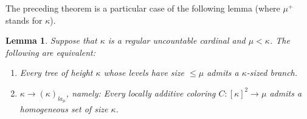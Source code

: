 \documentclass[11pt]{amsart}
\theoremstyle{plain}
\newtheorem{lemma}[theorem]{Lemma}
\theoremstyle{definition} %
\theoremstyle{remark}
\begin{document}
The preceding theorem
is a particular case of the following lemma (where $\mu^+$ stands for $\kappa$).%
\begin{lemma}\label{lemma 6}\label{the main lemma} Suppose that $\kappa$ is a regular uncountable cardinal and $\mu<\kappa$. The following are equivalent:
\begin{enumerate}
\item Every tree of height $\kappa$ whose levels have size $\le\mu$ admits a $\kappa$-sized branch.
\item $\kappa \rightarrow (\kappa)_{la_\mu}$, namely: Every locally additive coloring $C:[\kappa]^2\rightarrow\mu$ admits a homogeneous set of size $\kappa$.
\end{enumerate}
\end{lemma}
\end{document}
